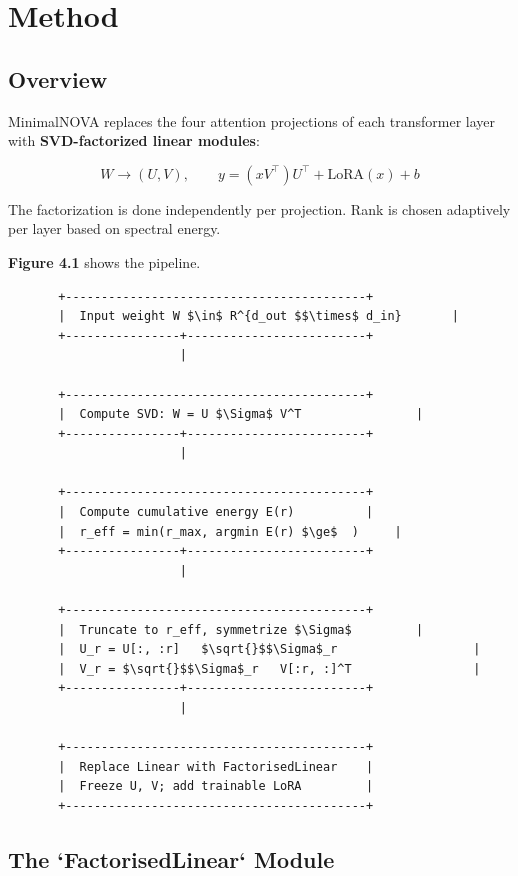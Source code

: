 
\section{Method}

\subsection{Overview}

MinimalNOVA replaces the four attention projections of each transformer layer 
with \textbf{SVD-factorized linear modules}:

\[
W \to (U, V), \qquad
y = (x V^\top) U^\top + \text{LoRA}(x) + b
\tag{4.1}
\]

The factorization is done independently per projection. Rank is chosen 
adaptively per layer based on spectral energy.

\textbf{Figure 4.1} shows the pipeline.

\begin{lstlisting}
       +------------------------------------------+
       |  Input weight W $\in$ R^{d_out $$\times$ d_in}       |
       +----------------+-------------------------+
                        |
                         
       +------------------------------------------+
       |  Compute SVD: W = U $\Sigma$ V^T                |
       +----------------+-------------------------+
                        |
                         
       +------------------------------------------+
       |  Compute cumulative energy E(r)          |
       |  r_eff = min(r_max, argmin E(r) $\ge$  )     |
       +----------------+-------------------------+
                        |
                         
       +------------------------------------------+
       |  Truncate to r_eff, symmetrize $\Sigma$         |
       |  U_r = U[:, :r]   $\sqrt{}$$\Sigma$_r                   |
       |  V_r = $\sqrt{}$$\Sigma$_r   V[:r, :]^T                 |
       +----------------+-------------------------+
                        |
                         
       +------------------------------------------+
       |  Replace Linear with FactorisedLinear    |
       |  Freeze U, V; add trainable LoRA         |
       +------------------------------------------+
\end{lstlisting}

\subsection{The `FactorisedLinear` Module}

